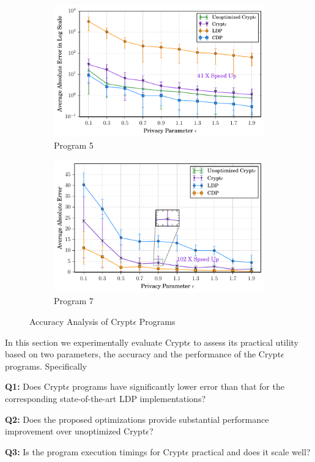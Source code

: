 \begin{figure}[ht]
\begin{subfigure}[b]{0.25\linewidth}
    \centering    \includegraphics[width=1\linewidth]{t5_finals.pdf}
        \caption{Program 5}
        \label{fig:P5}\end{subfigure}%
      \begin{subfigure}[b]{0.25\linewidth}
    \centering    \includegraphics[width=1\linewidth]{t7_finals.pdf}
        \caption{Program 7}
        \label{fig:P7}
    \end{subfigure}
   \caption{Accuracy Analysis of Crypt$\epsilon$ Programs}
   \label{accuracy}
\end{figure}
In this section we experimentally evaluate  Crypt$\epsilon$ to assess its practical utility  based on two parameters, the accuracy and the performance of the Crypt$\epsilon$ programs. Specifically\squishlist \item \textbf{Q1:} Does Crypt$\epsilon$ programs have significantly lower error than that for the corresponding state-of-the-art \textsf{LDP} implementations?\item \textbf{Q2:} Does the proposed optimizations provide substantial performance improvement over unoptimized Crypt$\epsilon$? \item \textbf{Q3:} Is the program execution timings for Crypt$\epsilon$ practical and does it scale well? \squishend
